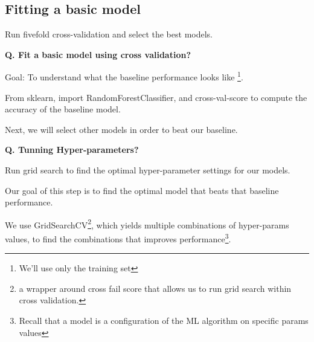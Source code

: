 \subsection{Fitting a basic model}
\begin{transitionsubframe}
  \begin{center}
    \Huge Run fivefold cross-validation and select the best models.
  \end{center}
\end{transitionsubframe}

\begin{frame}[fragile]{\textbf{Q. Fit a basic model using cross validation?}}
  \begin{wideitemize}
    \item Goal: To understand what the baseline performance looks like
    \footnote{We'll use only the training set}.
    \begin{wideitemize}
      \item From sklearn, import RandomForestClassifier, and cross-val-score
      to compute the accuracy of the baseline model.
    \end{wideitemize}
    \item Next, we will select other models in order to beat our baseline.
  \end{wideitemize}
\end{frame}

\begin{frame}[fragile]{\textbf{Q. Tunning Hyper-parameters?}}
  \begin{wideitemize}
    \item Run grid search to find the optimal hyper-parameter settings for our models.
    \item Our goal of this step is to find the optimal model that beats that baseline performance.
    \item We use GridSearchCV\footnote{a wrapper around cross fail score that allows us to
    run grid search within cross validation.}, which yields multiple combinations of hyper-params
    values, to find the combinations that improves performance\footnote{Recall that a model is a
    configuration of the ML algorithm on specific params values}.
  \end{wideitemize}
\end{frame}

